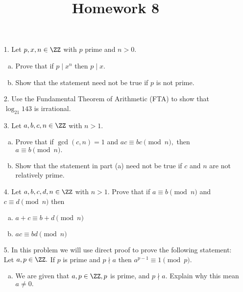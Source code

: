 \documentclass{article}
\begin{document}
\title{Homework 8}
\maketitle
\thispagestyle{fancy}

\begin{itemize}
	\item[1.] Let $p, x, n\in \ZZ$ with $p$ prime and $n>0.$
		\begin{enumerate}[(a)]
			\item Prove that if $p\mid x^n$ then $p\mid x.$

			\item Show that the statement need not be true if $p$ is not prime.
				
		\end{enumerate}

	\item[2.] Use the Fundamental Theorem of Arithmetic (FTA) to show that $\log_{21} 143$ is irrational.

	\item[3.] Let $a, b, c, n\in\ZZ$ with $n>1.$
		\begin{enumerate}[(a)]
			\item Prove that if $\gcd(c, n)=1$ and $ac\equiv bc\pmod n,$ then $a\equiv b\pmod n.$

			\item Show that the statement in part (a) need not be true if $c$ and $n$ are not relatively prime.
				
		\end{enumerate}

	\item[4.] Let $a, b, c, d, n\in \ZZ$ with $n>1.$ Prove that if $a\equiv b\pmod n$ and $c\equiv d\pmod n$ then
		\begin{enumerate}[(a)]
			\item $a+c\equiv b+d\pmod n$

			\item $ac\equiv bd\pmod n$
				
		\end{enumerate}

	\item[5.] In this problem we will use direct proof to prove the following statement: Let $a, p\in\ZZ.$ If $p$ is prime and $p\nmid a$ then $a^{p-1}\equiv1\pmod p.$
		\begin{enumerate}[(a)]
			\item We are given that $a, p\in\ZZ, p$ is prime, and $p\nmid a.$ Explain why this mean $a\neq 0.$


\end{enumerate}
\end{itemize}
\end{document}
